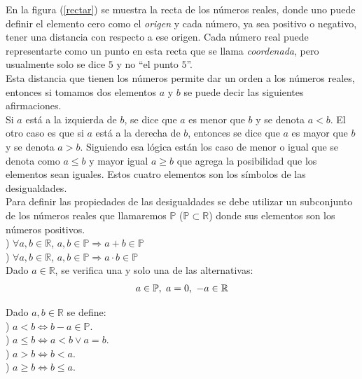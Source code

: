 En la figura (\ref{rectar}) se muestra la recta de los números reales, donde uno puede definir el elemento cero como el \textit{origen} y cada número, ya sea positivo o negativo, tener una distancia con respecto a ese origen. Cada número real puede representarte como un punto en esta recta que se llama \textit{coordenada}, pero usualmente solo se dice $5$ y no ``el punto $5$''.\\
Esta distancia que tienen los números permite dar un orden a los números reales, entonces si tomamos dos elementos $a$ y $b$ se puede decir las siguientes afirmaciones.\\

Si $a$ está a la izquierda de $b$, se dice que $a$ es menor que $b$ y se denota $a<b$. El otro caso es que si $a$ está a la derecha de $b$, entonces se dice que $a$ es mayor que $b$ y se denota $a>b$. Siguiendo esa lógica están los caso de menor o igual que se denota como $a\leq b$ y mayor igual $a\geq b$ que agrega la posibilidad que los elementos sean iguales. Estos cuatro elementos son los símbolos de las desigualdades.\\

Para definir las propiedades de las desigualdades se debe utilizar un subconjunto de los números reales que llamaremos $\mathbb{P}$ ($\mathbb{P}\subset\mathbb{R}$) donde sus elementos son los números positivos.\\

) $\forall a,b\in\mathbb{R}$, $a,b\in\mathbb{P}\Rightarrow a+b\in\mathbb{P}$ \\

) $\forall a,b\in\mathbb{R}$, $a,b\in\mathbb{P}\Rightarrow a\cdot b\in\mathbb{P}$ \\

\noindent Dado $a\in\mathbb{R}$, se verifica una y solo una de las alternativas:\\
\begin{eqnarray*}
a\in\mathbb{P}, \hspace{3px} a=0, \hspace{3px} -a\in\mathbb{R}
\end{eqnarray*}

\begin{mydef}
Dado $a,b\in\mathbb{R}$ se define:\\

) $a<b\Leftrightarrow b-a\in\mathbb{P}$.\\
) $a\leq b\Leftrightarrow a<b\vee a=b$. \\
) $a>b\Leftrightarrow b<a$. \\
) $a\geq b\Leftrightarrow b\leq a$. \\
\end{mydef}

